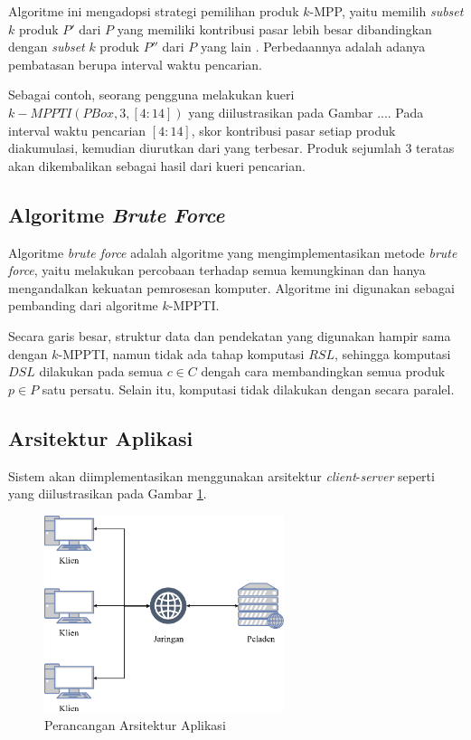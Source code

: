 Algoritme ini mengadopsi strategi pemilihan produk $k$-MPP, yaitu memilih \textit{subset} $k$ produk $P'$ dari $P$ yang memiliki kontribusi pasar lebih besar dibandingkan dengan \textit{subset} $k$ produk $P''$ dari $P$ yang lain \cite{kmpp}. Perbedaannya adalah adanya pembatasan berupa interval waktu pencarian. 

Sebagai contoh, seorang pengguna melakukan kueri $k-MPPTI(PBox, 3, [4:14])$ yang diilustrasikan pada Gambar .... Pada interval waktu pencarian $[4:14]$, skor kontribusi pasar setiap produk diakumulasi, kemudian diurutkan dari yang terbesar. Produk sejumlah $3$ teratas akan dikembalikan sebagai hasil dari kueri pencarian. 

\subsection{Algoritme \textit{Brute Force}}
\tab Algoritme \textit{brute force} adalah algoritme yang mengimplementasikan metode \textit{brute force}, yaitu melakukan percobaan terhadap semua kemungkinan dan hanya mengandalkan kekuatan pemrosesan komputer. Algoritme ini digunakan sebagai pembanding dari algoritme $k$-MPPTI.

Secara garis besar, struktur data dan pendekatan yang digunakan hampir sama dengan $k$-MPPTI, namun tidak ada tahap komputasi $RSL$, sehingga komputasi $DSL$ dilakukan pada semua $c \in C$ dengah cara membandingkan semua produk $p \in P$ satu persatu. Selain itu, komputasi tidak dilakukan dengan secara paralel. 

\subsection{Arsitektur Aplikasi} 
\tab Sistem akan diimplementasikan menggunakan arsitektur \textit{client}-\textit{server} seperti yang diilustrasikan pada Gambar \ref{fig:arsitektur}. 

\begin{figure}[h]
	\centering
	\includegraphics[width=7cm]{bab3/img/arsitektur.png}
	\caption{Perancangan Arsitektur Aplikasi}
	\label{fig:arsitektur}
\end{figure}

